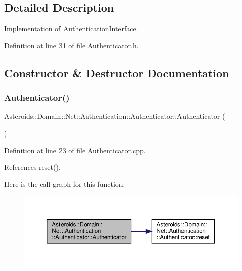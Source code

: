 \subsection{Detailed Description}
Implementation of \hyperlink{classAsteroids_1_1Domain_1_1Net_1_1Authentication_1_1AuthenticationInterface}{Authentication\+Interface}. 

Definition at line 31 of file Authenticator.\+h.



\subsection{Constructor \& Destructor Documentation}
\mbox{\label{classAsteroids_1_1Domain_1_1Net_1_1Authentication_1_1Authenticator_afadb967c25e27246382ace3ffe9ee85a}} 
\subsubsection{\texorpdfstring{Authenticator()}{Authenticator()}}
{\footnotesize\ttfamily Asteroids\+::\+Domain\+::\+Net\+::\+Authentication\+::\+Authenticator\+::\+Authenticator (\begin{DoxyParamCaption}{ }\end{DoxyParamCaption})}



Definition at line 23 of file Authenticator.\+cpp.



References reset().

Here is the call graph for this function\+:\nopagebreak
\begin{figure}[H]
\begin{center}
\leavevmode
\includegraphics[width=350pt]{classAsteroids_1_1Domain_1_1Net_1_1Authentication_1_1Authenticator_afadb967c25e27246382ace3ffe9ee85a_cgraph}
\end{center}
\end{figure}


